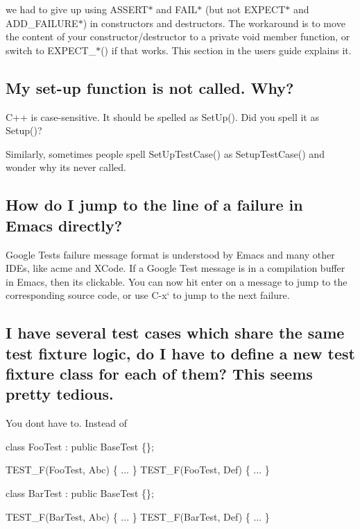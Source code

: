we had to give up using {\ttfamily A\+S\+S\+E\+R\+T$\ast$} and {\ttfamily F\+A\+I\+L$\ast$} (but not {\ttfamily E\+X\+P\+E\+C\+T$\ast$} and {\ttfamily A\+D\+D\+\_\+\+F\+A\+I\+L\+U\+R\+E$\ast$}) in constructors and destructors. The workaround is to move the content of your constructor/destructor to a private void member function, or switch to {\ttfamily E\+X\+P\+E\+C\+T\+\_\+$\ast$()} if that works. This section in the user\textquotesingle{}s guide explains it.

\subsection*{My set-\/up function is not called. Why?}

C++ is case-\/sensitive. It should be spelled as {\ttfamily Set\+Up()}. Did you spell it as {\ttfamily Setup()}?

Similarly, sometimes people spell {\ttfamily Set\+Up\+Test\+Case()} as {\ttfamily Setup\+Test\+Case()} and wonder why it\textquotesingle{}s never called.

\subsection*{How do I jump to the line of a failure in Emacs directly?}

Google Test\textquotesingle{}s failure message format is understood by Emacs and many other I\+D\+Es, like acme and X\+Code. If a Google Test message is in a compilation buffer in Emacs, then it\textquotesingle{}s clickable. You can now hit {\ttfamily enter} on a message to jump to the corresponding source code, or use {\ttfamily C-\/x}` to jump to the next failure.

\subsection*{I have several test cases which share the same test fixture logic, do I have to define a new test fixture class for each of them? This seems pretty tedious.}

You don\textquotesingle{}t have to. Instead of


\begin{DoxyCode}
class FooTest : public BaseTest \{\};

TEST\_F(FooTest, Abc) \{ ... \}
TEST\_F(FooTest, Def) \{ ... \}

class BarTest : public BaseTest \{\};

TEST\_F(BarTest, Abc) \{ ... \}
TEST\_F(BarTest, Def) \{ ... \}
\end{DoxyCode}


